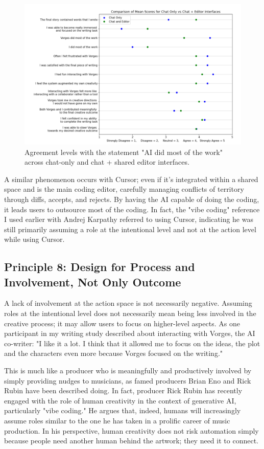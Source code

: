 \begin{figure}
    \centering
    \includegraphics[width=1\linewidth]{graphsharedspaces.png}
    \caption{Agreement levels with the statement "AI did most of the work" across chat-only and chat + shared editor interfaces.}
    \label{fig:graphsharedspaces}
\end{figure}

A similar phenomenon occurs with Cursor; even if it's integrated within a shared space and is the main coding editor, carefully managing conflicts of territory through diffs, accepts, and rejects. By having the AI capable of doing the coding, it leads users to outsource most of the coding. In fact, the "vibe coding" reference I used earlier with Andrej Karpathy referred to using Cursor, indicating he was still primarily assuming a role at the intentional level and not at the action level while using Cursor.


\subsection{Principle 8: Design for Process and Involvement, Not Only Outcome}

A lack of involvement at the action space is not necessarily negative. Assuming roles at the intentional level does not necessarily mean being less involved in the creative process; it may allow users to focus on higher-level aspects. As one participant in my writing study described about interacting with Vorges, the AI co-writer: "I like it a lot. I think that it allowed me to focus on the ideas, the plot and the characters even more because Vorges focused on the writing."

This is much like a producer who is meaningfully and productively involved by simply providing nudges to musicians, as famed producers Brian Eno and Rick Rubin have been described doing. In fact, producer Rick Rubin has recently engaged with the role of human creativity in the context of generative AI, particularly "vibe coding." He argues that, indeed, humans will increasingly assume roles similar to the one he has taken in a prolific career of music production. In his perspective, human creativity does not risk automation simply because people need another human behind the artwork; they need it to connect.

